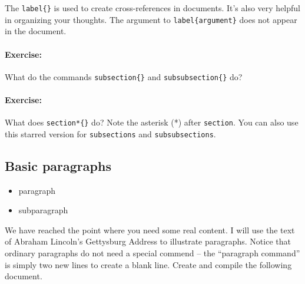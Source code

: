         The \texttt{label\{\}} is used to create cross-references in documents. It's also very helpful in organizing your thoughts. The argument to \texttt{label\{argument\}} does not appear in the document.

        \paragraph{Exercise:}What do the commands \texttt{subsection\{\}} and \texttt{subsubsection\{\}} do?

        \paragraph{Exercise:}What does \texttt{section*\{\}} do? Note the asterisk (*) after \texttt{section}. You can also use this starred version for \texttt{subsections} and \texttt{subsubsections}.

        \subsection{Basic paragraphs}
        \label{Basic-paragraphs}
        
        \begin{framed}
            \begin{itemize}
                \item{paragraph}
                \item{subparagraph}
            \end{itemize}
        \end{framed}


        We have reached the point where you need some real content. I will use the text of Abraham Lincoln's Gettysburg Address to illustrate paragraphs. Notice that ordinary paragraphs do not need a special commend -- the ``paragraph command'' is simply two new lines to create a blank line. Create and compile the following document.

